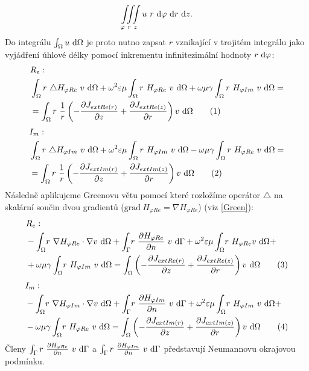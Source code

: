 \documentclass[12pt,a4paper,oneside]{article}
\numberwithin{equation}{section} %
\numberwithin{figure}{section} %
\numberwithin{table}{section} %
\newcommand{\grad}{\mathrm{grad}\ }
\newcommand\numberthis{\addtocounter{equation}{1}\tag{\theequation}}
\begin{document}
\begin{equation}
\iiint \limits_{\varphi ~ r ~ z} u ~ r ~ \mathrm{d} \varphi ~ \mathrm{d} r ~ \mathrm{d} z . 
\end{equation}
Do integrálu $\int _{\Omega} u ~ \mathrm{d} \Omega$ je proto nutno zapsat $r$ vznikající v trojitém integrálu jako vyjádření úhlové délky pomocí inkrementu infinitezimální hodnoty $r ~ \mathrm{d} \varphi$:
\begin{align*}
&R_e:
\\
&\int _{\Omega} r ~ \triangle H _{\varphi Re} ~ v ~ \ud \Omega + \omega ^2 \varepsilon \mu \int _{\Omega} r ~ H _{\varphi Re} ~ v ~ \ud \Omega + \omega \mu \gamma \int _{\Omega} r ~ H _{\varphi Im} ~ v ~ \ud \Omega = 
\\
&= \int _{\Omega} r ~ \frac{1}{r} \left( - \frac{\partial J _{extRe(r)}}{\partial z} + \frac{\partial J _{extRe(z)}}{\partial r} \right) v ~ \ud \Omega
\numberthis
\end{align*}
\begin{align*}
&I_m:
\\
&\int _{\Omega} r ~ \triangle H _{\varphi Im} ~ v ~ \ud \Omega + \omega ^2 \varepsilon \mu \int _{\Omega} r ~ H _{\varphi Im} ~ v ~ \ud \Omega - \omega \mu \gamma \int _{\Omega} r ~ H _{\varphi Re} ~ v ~ \ud \Omega = 
\\
&= \int _{\Omega} r ~ \frac{1}{r} \left( - \frac{\partial J _{extIm(r)}}{\partial z} + \frac{\partial J _{extIm(z)}}{\partial r} \right) v ~ \ud \Omega
\numberthis
\end{align*}
Následně aplikujeme Greenovu větu pomocí které rozložíme operátor $\triangle$ na skalární součin dvou gradientů ($\grad H _{\varphi Re} = \nabla H _{\varphi Re}$) (viz \ref{Green}):
\begin{align*}
&R_e:
\\
&- \int _{\Omega} \! r ~ \nabla H _{\varphi Re} \cdot \nabla v ~ \ud \Omega + \int _{\Gamma} \! r ~ \frac{\partial H _{\varphi Re}}{\partial n} ~ v ~ \ud \Gamma + \omega ^2 \varepsilon \mu \int _{\Omega} \! r ~ H _{\varphi Re} v ~ \ud \Omega +\\
& + \omega \mu \gamma \int _{\Omega} \! r ~ H _{\varphi Im} ~ v ~ \ud \Omega = \int _{\Omega} \left( - \frac{\partial J _{extRe(r)}}{\partial z} + \frac{\partial J _{extRe(z)}}{\partial r} \right) v ~ \ud \Omega
\numberthis
\end{align*}
\begin{align*}
&I_m:
\\
&- \int _{\Omega} \! r ~ \nabla H _{\varphi Im} \cdot \nabla v ~ \ud \Omega + \int _{\Gamma} \! r ~ \frac{\partial H _{\varphi Im}}{\partial n} ~ v ~ \ud \Gamma + \omega ^2 \varepsilon \mu \int _{\Omega} \! r ~ H _{\varphi Im} ~ v ~ \ud \Omega +\\
& - \omega \mu \gamma \int _{\Omega} \! r ~ H _{\varphi Re} ~ v ~ \ud \Omega = \int _{\Omega} \left( - \frac{\partial J _{extIm(r)}}{\partial z} + \frac{\partial J _{extIm(z)}}{\partial r} \right) v ~ \ud \Omega
\numberthis
\end{align*}
Členy $\int _{\Gamma} r ~ \frac{\partial H _{\varphi Re}}{\partial n} ~ v ~ \mathrm{d} \Gamma$ a $\int _{\Gamma} r ~ \frac{\partial H _{\varphi Im}}{\partial n} ~ v ~ \mathrm{d} \Gamma$ představují Neumannovu okrajovou podmínku.
\end{document}
